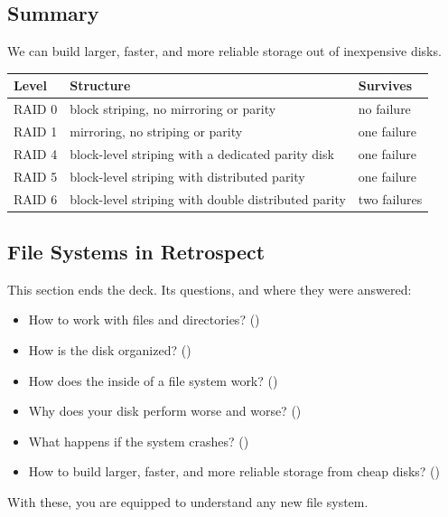 \subsection{Summary}

We can build larger, faster, and more reliable storage out of inexpensive disks.
\begin{center}
\small
\begin{tabular}{lll}
  \toprule
  Level & Structure & Survives \\
  \midrule
  RAID 0 & block striping, no mirroring or parity & no failure \\
  RAID 1 & mirroring, no striping or parity & one failure \\
  RAID 4 & block-level striping with a dedicated parity disk & one failure \\
  RAID 5 & block-level striping with distributed parity & one failure \\
  RAID 6 & block-level striping with double distributed parity & two failures \\
  \bottomrule
\end{tabular}
\end{center}

\subsection{File Systems in Retrospect}

This section ends the deck. Its questions, and where they were answered:
\begin{itemize}
  \item How to work with files and directories? ()
  \item How is the disk organized? ()
  \item How does the inside of a file system work? ()
  \item Why does your disk perform worse and worse? ()
  \item What happens if the system crashes? ()
  \item How to build larger, faster, and more reliable storage from cheap disks? ()
\end{itemize}
With these, you are equipped to understand any new file system.
